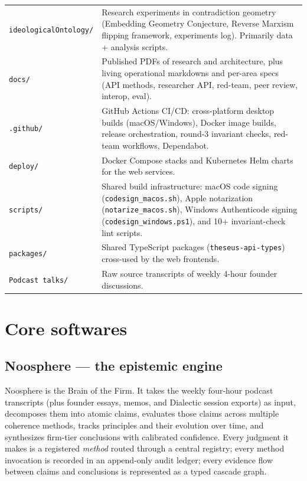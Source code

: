 \documentclass[11pt,letterpaper]{article}
\newcommand{\file}[1]{\texttt{#1}}
\begin{document}
\begin{longtable}{p{3.2cm} p{11.3cm}}
\file{ideologicalOntology/}  & Research experiments in contradiction geometry (Embedding Geometry Conjecture, Reverse Marxism flipping framework, experiments log). Primarily data + analysis scripts. \\
\file{docs/}                 & Published PDFs of research and architecture, plus living operational markdowns and per-area specs (API methods, researcher API, red-team, peer review, interop, eval). \\
\file{.github/}              & GitHub Actions CI/CD: cross-platform desktop builds (macOS/Windows), Docker image builds, release orchestration, round-3 invariant checks, red-team workflows, Dependabot. \\
\file{deploy/}               & Docker Compose stacks and Kubernetes Helm charts for the web services. \\
\file{scripts/}              & Shared build infrastructure: macOS code signing (\texttt{codesign\_macos.sh}), Apple notarization (\texttt{notarize\_macos.sh}), Windows Authenticode signing (\texttt{codesign\_windows.ps1}), and 10{+} invariant-check lint scripts. \\
\file{packages/}             & Shared TypeScript packages (\texttt{theseus-api-types}) cross-used by the web frontends. \\
\file{Podcast talks/}        & Raw source transcripts of weekly 4-hour founder discussions. \\
\bottomrule
\end{longtable}

\section{Core softwares}

\subsection{Noosphere --- the epistemic engine}

Noosphere is the Brain of the Firm. It takes the weekly four-hour podcast transcripts (plus founder essays, memos, and Dialectic session exports) as input, decomposes them into atomic claims, evaluates those claims across multiple coherence methods, tracks principles and their evolution over time, and synthesizes firm-tier conclusions with calibrated confidence. Every judgment it makes is a registered \emph{method} routed through a central registry; every method invocation is recorded in an append-only audit ledger; every evidence flow between claims and conclusions is represented as a typed cascade graph.
\end{document}
